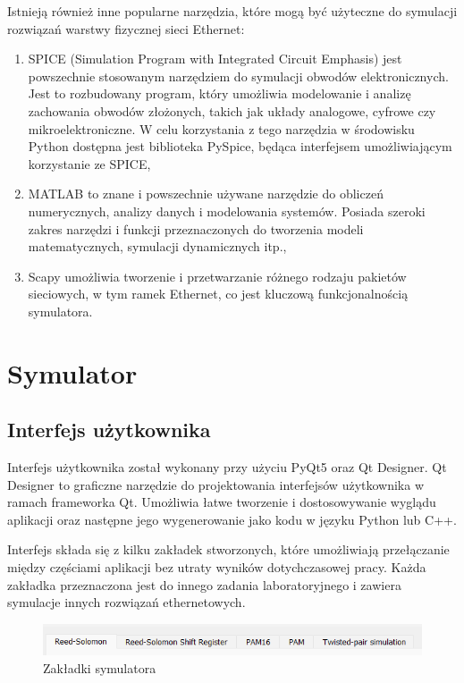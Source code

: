 Istnieją również inne popularne narzędzia, które mogą być użyteczne do symulacji rozwiązań warstwy fizycznej sieci Ethernet:
\begin{enumerate}
    \item SPICE (Simulation Program with Integrated Circuit Emphasis) jest powszechnie stosowanym narzędziem do symulacji obwodów elektronicznych. Jest to rozbudowany program, który umożliwia modelowanie i analizę zachowania obwodów złożonych, takich jak układy analogowe, cyfrowe czy mikroelektroniczne. W celu korzystania z tego narzędzia w środowisku Python dostępna jest biblioteka PySpice, będąca interfejsem umożliwiającym korzystanie ze SPICE,
    \item MATLAB to znane i powszechnie używane narzędzie do obliczeń numerycznych, analizy danych i modelowania systemów. Posiada szeroki zakres narzędzi i funkcji przeznaczonych do tworzenia modeli matematycznych, symulacji dynamicznych itp.,
    \item Scapy umożliwia tworzenie i przetwarzanie różnego rodzaju pakietów sieciowych, w tym ramek Ethernet, co jest kluczową funkcjonalnością symulatora.
\end{enumerate}

\section{Symulator}
\subsection{Interfejs użytkownika}
Interfejs użytkownika został wykonany przy użyciu PyQt5 oraz Qt Designer. Qt Designer to graficzne narzędzie do projektowania interfejsów użytkownika w ramach frameworka Qt. Umożliwia łatwe tworzenie i dostosowywanie wyglądu aplikacji oraz następne jego wygenerowanie jako kodu w języku Python lub C++.

Interfejs składa się z kilku zakładek stworzonych, które umożliwiają przełączanie między częściami aplikacji bez utraty wyników dotychczasowej pracy. Każda zakładka przeznaczona jest do innego zadania laboratoryjnego i zawiera symulacje innych rozwiązań ethernetowych. 

\begin{figure}[ht]
    \centering
    \includegraphics{images/zakladki.png}
    \caption{Zakładki symulatora}
    \label{fig:zakladki_image}
\end{figure}

